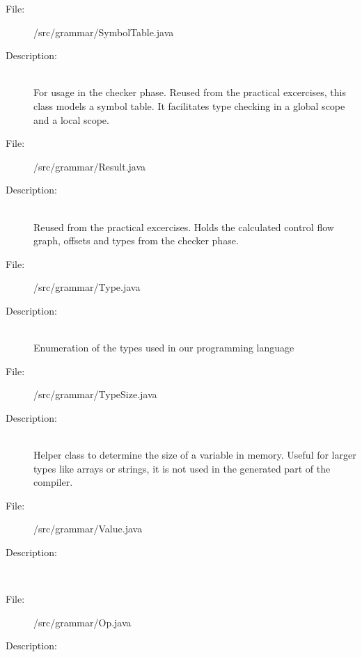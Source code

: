 \documentclass[10pt,a4paper]{report}
\begin{document}
\begin{description}
	\item[File:] /src/grammar/SymbolTable.java
	\item[Description:] \hfill \\
		For usage in the checker phase. Reused from the practical excercises, this class models a symbol table. It facilitates type checking in a global scope and a local scope. 
\end{description}

\begin{description}
	\item[File:] /src/grammar/Result.java
	\item[Description:] \hfill \\
		Reused from the practical excercises. Holds the calculated control flow graph, offsets and types from the checker phase. 
\end{description}

\begin{description}
	\item[File:] /src/grammar/Type.java
	\item[Description:] \hfill \\
		Enumeration of the types used in our programming language
\end{description}

\begin{description}
	\item[File:] /src/grammar/TypeSize.java
	\item[Description:] \hfill \\
		Helper class to determine the size of a variable in memory. Useful for larger types like arrays or strings, it is not used in the generated part of the compiler.
\end{description}

\begin{description}
	\item[File:] /src/grammar/Value.java
	\item[Description:] \hfill \\
\end{description}

\begin{description}
	\item[File:] /src/grammar/Op.java
	\item[Description:] \hfill \\
\end{description}
\end{document}

